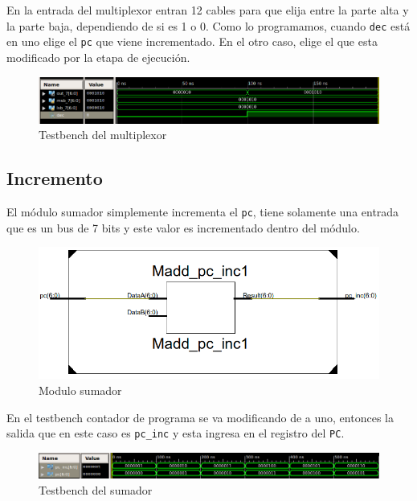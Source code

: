 En la entrada del multiplexor entran 12 cables para que elija entre la parte alta y la parte baja, dependiendo de si es 1 o 0. Como lo programamos, cuando \texttt{dec} est\'a en uno elige el \texttt{pc}  que viene incrementado. En el otro caso, elige el que esta modificado por la etapa de ejecución.

\begin{figure}[H]
\centering
\includegraphics[scale=0.4]{Capitulo01/mux_test}
\caption{Testbench del multiplexor}
\label{fig:muxt}
\end{figure}

\subsection{Incremento}
El m\'odulo sumador simplemente incrementa el \texttt{pc}, tiene solamente una entrada que es un bus de 7 bits y este valor es incrementado dentro del m\'odulo. 


\begin{figure}[H]
\centering
\includegraphics[scale=0.45]{img/sumador_inside}
\caption{Modulo sumador}
\label{fig:sumador}
\end{figure}


En el testbench contador de programa se va modificando de a uno, entonces la salida que en este caso es \texttt{pc\_inc} y esta ingresa en el registro del \texttt{PC}. 


\begin{figure}[H]
\centering
\includegraphics[scale=0.45]{Capitulo01/sum_test}
\caption{Testbench del sumador}
\label{fig:sumt}
\end{figure}


